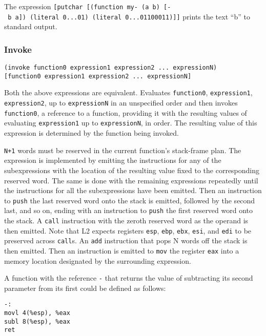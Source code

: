 \documentclass[]{article}
\begin{document}
The expression
\texttt{{[}putchar\ {[}(function\ my-\ (a\ b)\ {[}-\ b\ a{]})\ (literal\ 0...01)\ (literal\ 0...01100011){]}{]}}
prints the text ``b'' to standard output.

\hypertarget{invoke}{\subsubsection{Invoke}\label{invoke}}

\begin{verbatim}
(invoke function0 expression1 expression2 ... expressionN)
[function0 expression1 expression2 ... expressionN]
\end{verbatim}

Both the above expressions are equivalent. Evaluates \texttt{function0},
\texttt{expression1}, \texttt{expression2}, up to \texttt{expressionN}
in an unspecified order and then invokes \texttt{function0}, a reference
to a function, providing it with the resulting values of evaluating
\texttt{expression1} up to \texttt{expressionN}, in order. The resulting
value of this expression is determined by the function being invoked.

\texttt{N+1} words must be reserved in the current function's
stack-frame plan. The expression is implemented by emitting the
instructions for any of the subexpressions with the location of the
resulting value fixed to the corresponding reserved word. The same is
done with the remaining expressions repeatedly until the instructions
for all the subexpressions have been emitted. Then an instruction to
\texttt{push} the last reserved word onto the stack is emitted, followed
by the second last, and so on, ending with an instruction to
\texttt{push} the first reserved word onto the stack. A \texttt{call}
instruction with the zeroth reserved word as the operand is then
emitted. Note that L2 expects registers \texttt{esp}, \texttt{ebp},
\texttt{ebx}, \texttt{esi}, and \texttt{edi} to be preserved across
\texttt{call}s. An \texttt{add} instruction that pops N words off the
stack is then emitted. Then an instruction is emitted to \texttt{mov}
the register \texttt{eax} into a memory location designated by the
surrounding expression.

A function with the reference \texttt{-} that returns the value of
subtracting its second parameter from its first could be defined as
follows:

\begin{verbatim}
-:
movl 4(%esp), %eax
subl 8(%esp), %eax
ret
\end{verbatim}
\end{document}
